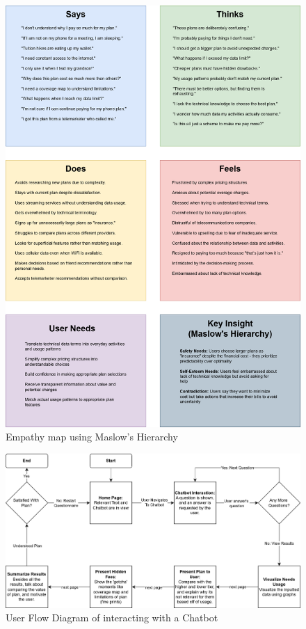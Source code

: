 \documentclass[conference]{IEEEtran}
\begin{document}
\begin{figure}[H]
    \centering
    \includegraphics[width=1\linewidth]{EmpathyMap.png}
    \caption{Empathy map using Maslow's Hierarchy}
    \label{fig:empathy map}
\end{figure}

\begin{figure}[H]
    \centering
    \includegraphics[width=1\linewidth]{FlowChart_357.png}
    \caption{User Flow Diagram of interacting with a Chatbot}
    \label{fig:user flow}
\end{figure}
\end{document}

